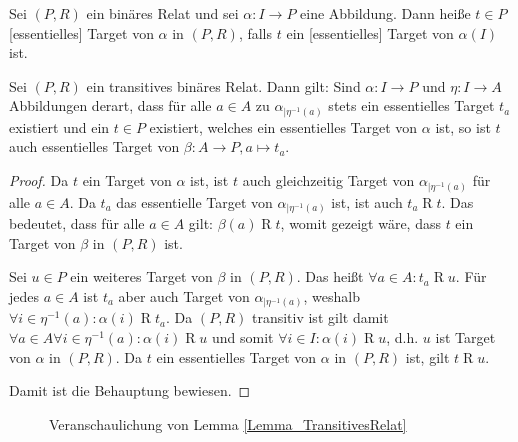 \documentclass{article}
\begin{document}
\begin{definition}
  Sei $(P, R)$ ein binäres Relat und sei $\alpha \colon I \to P$ eine Abbildung.
  Dann heiße $t \in P$ [essentielles] Target von $\alpha$ in $(P, R)$,
  falls $t$ ein [essentielles] Target von $\alpha(I)$ ist.
\end{definition}

\begin{lemma}\label{Lemma_TransitivesRelat}
  Sei $(P, R)$ ein transitives binäres Relat. Dann gilt:
  Sind $\alpha \colon I \to P$ und $\eta \colon I \to A$ Abbildungen derart, 
  dass für alle $a \in A$ zu $\alpha_{\mid \eta^{-1}(a)}$ stets ein essentielles Target $t_a$ existiert
  und ein $t \in P$ existiert, welches ein essentielles Target von $\alpha$ ist,
  so ist $t$ auch essentielles Target von $\beta \colon A \to P, a \mapsto t_a$.
\end{lemma}
\begin{proof}
  Da $t$ ein Target von $\alpha$ ist,
  ist $t$ auch gleichzeitig Target von $\alpha_{\mid \eta^{-1}(a)}$
  für alle $a \in A$.
  Da $t_a$ das essentielle Target von $\alpha_{\mid \eta^{-1}(a)}$ ist, ist auch $t_a \mathrel{R} t$.
  Das bedeutet, dass für alle $a \in A$ gilt: $\beta(a) \mathrel{R} t$, womit gezeigt wäre, 
  dass $t$ ein Target von $\beta$ in $(P, R)$ ist.

  Sei $u \in P$ ein weiteres Target von $\beta$ in $(P, R)$.
  Das heißt $\forall a \in A \colon t_a \mathrel{R} u$.
  Für jedes $a \in A$ ist $t_a$ aber auch Target von $\alpha_{\mid \eta^{-1}(a)}$,
  weshalb $\forall i \in \eta^{-1}(a) \colon \alpha(i) \mathrel{R} t_a$.
  Da $(P, R)$ transitiv ist gilt damit $\forall a \in A \forall i \in \eta^{-1}(a) \colon \alpha(i) \mathrel{R} u$
  und somit $\forall i \in I \colon \alpha(i) \mathrel{R} u$, d.h. $u$ ist Target von $\alpha$ in $(P, R)$.
  Da $t$ ein essentielles Target von $\alpha$ in $(P, R)$ ist, gilt $t \mathrel{R} u$.

  Damit ist die Behauptung bewiesen.
\end{proof}

\begin{figure}
  \caption{Veranschaulichung von Lemma \ref{Lemma_TransitivesRelat}}
  \label{fig:TransitivesRelat}
\end{figure}
\end{document}
